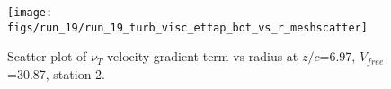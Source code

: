 \begin{figure}[H]
\centering
\texttt{[image: figs/run\_19/run\_19\_turb\_visc\_ettap\_bot\_vs\_r\_meshscatter]}
\caption{Scatter plot of $\nu_T$ velocity gradient term vs radius at $z/c$=6.97, $V_{free}$=30.87, station 2.}
\label{fig:run_19_turb_visc_ettap_bot_vs_r_meshscatter}
\end{figure}


